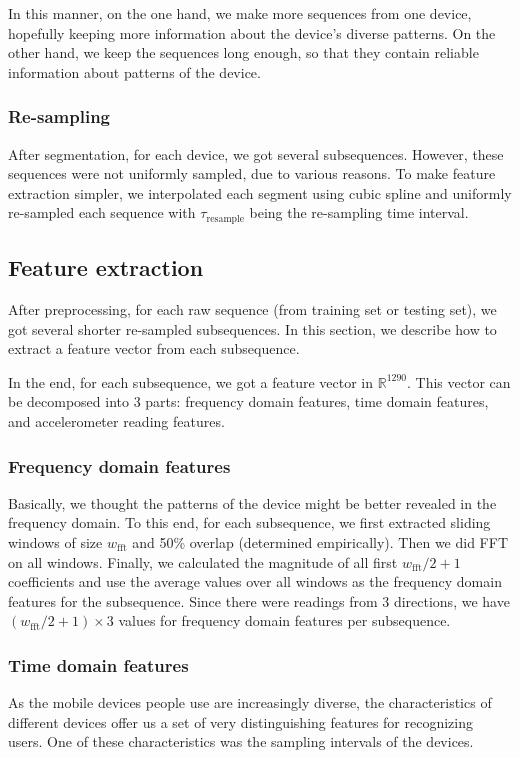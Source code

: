 \documentclass{article} %
\begin{document}
In this manner, on the one hand, we make more sequences from one device, hopefully keeping more information about the device's diverse patterns. On the other hand, we keep the sequences long enough, so that they contain reliable information about patterns of the device.

\subsubsection{Re-sampling} 
After segmentation, for each device, we got several subsequences. However, these sequences were not uniformly sampled, due to various reasons. To make feature extraction simpler, we interpolated each segment using cubic spline and uniformly re-sampled each sequence with  $\tau_\mathrm{resample}$ being the re-sampling time interval.

\subsection{Feature extraction}

After preprocessing, for each raw sequence (from training set or testing set), we got several shorter re-sampled subsequences. In this section, we describe how to extract a feature vector from each subsequence.
	
In the end, for each subsequence, we got a feature vector in $\mathbb{R}^{1290}$. This vector can be decomposed into 3 parts: frequency domain features, time domain features, and accelerometer reading features.

\subsubsection{Frequency domain features}
Basically, we thought the patterns of the device might be better revealed in the frequency domain. To this end, for each subsequence, we first extracted sliding windows of size $w_\mathrm{fft}$ and 50\% overlap (determined empirically). Then we did FFT on all windows. Finally, we calculated the magnitude of all first $w_\mathrm{fft}/2 + 1$ coefficients and use the average values over all windows as the frequency domain features for the subsequence. Since there were readings from 3 directions, we have $(w_\mathrm{fft}/2 + 1)\times 3$ values for frequency domain features per subsequence.


\subsubsection{Time domain features}
As the mobile devices people use are increasingly diverse, the characteristics of different devices offer us a set of very distinguishing features for recognizing users. One of these characteristics was the sampling intervals of the devices.
\end{document}
